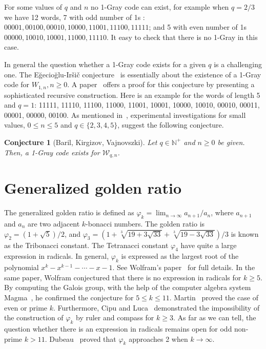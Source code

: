 \documentclass[a4paper,12pt]{article}
\newtheorem{conjecture}{Conjecture}
\theoremstyle{definition}
\newcommand{\W}{\mathcal{W}}
\newcommand{\N}{\mathbb{N}}
\let\le\leqslant
\let\ge\geqslant
\begin{document}
For some values of $q$ and $n$ no 1-Gray code can exist, for example
when $q=2/3$ we have 12 words,
7 with odd number of 1s : $00001, 00100, 00010, 10000, 11001, 11100, 11111$;
and 5 with even number of 1s $00000, 10010, 10001, 11000, 11110$.
It easy to check that there is no 1-Gray in this case.


In general the question whether a 1-Gray code exists for a given $q$
is a challenging one. The Eğecioğlu-Iršič conjecture~\cite{EI} is
essentially about the existence of a 1-Gray code for $W_{1,n}, n \ge
0$. A paper~\cite{ourfibo} offers a proof for this conjecture by
presenting a sophisticated recursive construction. Here is an example
for the words of length 5 and $q=1$: 11111, 11110, 11100, 11000,
11001, 10001, 10000, 10010, 00010, 00011, 00001, 00000, 00100.  As
mentioned in~\cite{ourfibo}, experimental investigations for small
values, $0 \le n \le 5$ and $q \in \{2,3,4,5\}$, suggest the following
conjecture.

\begin{conjecture}[Baril, Kirgizov, Vajnovszki]
  Let $q \in \N^+$ and $n \ge 0$ be given.
  Then, a 1-Gray code exists for $\W_{q,n}$.
\end{conjecture}

\section{Generalized golden ratio}

The generalized golden ratio is defined as $\varphi_k = \lim_{n\to
  \infty}a_{n+1}/a_{n}$, where $a_{n+1}$ and $a_{n}$ are two adjacent
$k$-bonacci numbers.  The golden ratio is $\varphi_2 =
(1+\sqrt{5})/2$, and $\varphi_3 = (1+{\sqrt[{3}]{19+3{\sqrt
      {33}}}}+{\sqrt[{3}]{19-3{\sqrt {33}}}})/3$ is known as the
Tribonacci constant.  The Tetranacci constant $\varphi_4$ have quite a
large expression in radicals. In general, $\varphi_k$ is expressed as
the largest root of the polynomial $x^k - x^{k-1} - \cdots - x - 1$.
See Wolfram's paper~\cite{wolf} for full details.  In the same paper,
Wolfram conjectured that there is no expression in radicals for $k \ge
5$. By computing the Galois group, with the help of the computer
algebra system Magma~\cite{magma}, he confirmed the conjecture for $5
\le k \le 11$.  Martin~\cite{martin} proved the case of even or prime
$k$. Furthermore, Cipu and Luca~\cite{cipu} demonstrated the
impossibility of the construction of $\varphi_k$ by ruler and compass
for $k \ge 3$. As far as we can tell, the question whether there is an
expression in radicals remains open for odd non-prime $k > 11$.
Dubeau~\cite{dubeau} proved that $\varphi_k$ approaches 2 when $k \to
\infty.$
\end{document}
